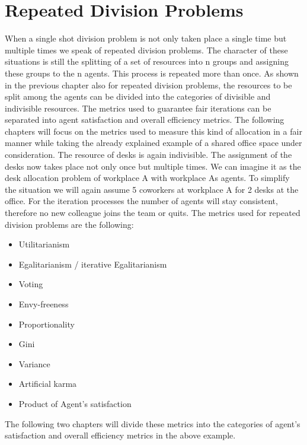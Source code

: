 \documentclass[german, a4paper, 11pt, oneside]{scrbook}
\begin{document}
\section{Repeated Division Problems}
When a single shot division problem is not only taken place a single time but multiple times we speak of repeated division problems. The character of these situations is still the splitting of a set of resources into n groups and assigning these groups to the n agents. This process is repeated more than once. As shown in the previous chapter also for repeated division problems, the resources to be split among the agents can be divided into the categories of divisible and indivisible resources. The metrics used to guarantee fair iterations can be separated into agent satisfaction and overall efficiency metrics. The following chapters will focus on the metrics used to measure this kind of allocation in a fair manner while taking the already explained example of a shared office space under consideration. The resource of desks is again indivisible. The assignment of the desks now takes place not only once but multiple times. We can imagine it as the desk allocation problem of workplace A with workplace As agents. To simplify the situation we will again assume 5 coworkers at workplace A for 2 desks at the office. For the iteration processes the number of agents will stay consistent, therefore no new colleague joins the team or quits. The metrics used for repeated division problems are the following:
\begin{itemize}
  \item Utilitarianism
  \item Egalitarianism / iterative Egalitarianism
  \item Voting
  \item Envy-freeness
  \item Proportionality
\item Gini
\item Variance
\item Artificial karma
\item Product of Agent's satisfaction
\end{itemize}
The following two chapters will divide these metrics into the categories of agent's satisfaction and overall efficiency metrics in the above example.
\end{document}

